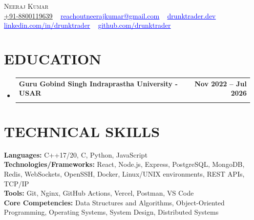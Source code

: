 \documentclass[letterpaper,10pt]{article}
\makeatletter
\newcommand{\resumeSubheading}[4]{
  \vspace{-2pt}\item
    \begin{tabular*}{1.0\textwidth}[t]{l@{\extracolsep{\fill}}r}
      \textbf{\small#1} & \textbf{\small #2} \\
      \text{\small#3} & \text{\small #4} \\
      
    \end{tabular*}\vspace{-7pt}
}
\newcommand{\resumeSubHeadingListStart}{\begin{itemize}[leftmargin=0.0in, label={}]}
\newcommand{\resumeSubHeadingListEnd}{\end{itemize}}
\makeatother
\begin{document}

\begin{center}
    {\Huge \scshape Neeraj Kumar} \\ \vspace{1pt}
    \small \href{tel:+91-8800119639}{\underline{+91-8800119639}} ~ 
    \href{mailto:reachoutneerajkumar@gmail.com}{\textcolor{blue}{\underline{reachoutneerajkumar@gmail.com}}} ~ 
    \href{https://www.drunktrader.dev/}{\textcolor{blue}{\underline{drunktrader.dev}}} ~ 
    \href{https://linkedin.com/in/drunktrader}{\textcolor{blue}{\underline{linkedin.com/in/drunktrader}}} ~
    \href{https://github.com/drunktrader}{\textcolor{blue}{\underline{github.com/drunktrader}}} ~
\end{center}
\vspace{-16pt}

\section{EDUCATION}
  \resumeSubHeadingListStart
    \resumeSubheading
      {Guru Gobind Singh Indraprastha University - USAR}{Nov 2022 -- Jul 2026}
      {\textbf{Bachelor's Degree} - Automation \& Robotics - \textbf{CGPA} - \textbf{7.00}}{New Delhi}
  \resumeSubHeadingListEnd
  \vspace{-10pt}


\section{TECHNICAL SKILLS}
 \begin{itemize}[leftmargin=0.15in, label={}]
    \small{\item{
     \textbf{\small{Languages:}}{  \small{C++17/20, C, Python, JavaScript}} \\ \vspace{1pt}
     \vspace{1pt}
     \textbf{\small{Technologies/Frameworks:}}{  \small{React, Node.js, Express, PostgreSQL, MongoDB, Redis, WebSockets, OpenSSH, Docker, Linux/UNIX environments, REST APIs, TCP/IP}} \\ \vspace{1pt}
     \vspace{1pt}
     \textbf{\small{Tools:}}{  \small{Git, Nginx, GitHub Actions, Vercel, Postman, VS Code}} \\ \vspace{1pt}
     \vspace{1pt}
     \textbf{\small{Core Competencies:}}{  \small{Data Structures and Algorithms, Object-Oriented Programming, Operating Systems, System Design, Distributed Systems}} \\
    }}
 \end{itemize}
\end{document}
